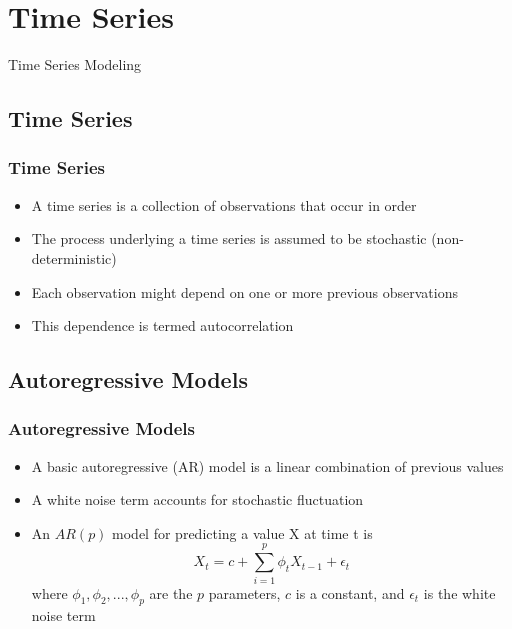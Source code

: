 \documentclass[presentation]{beamer}
\begin{document}
\section{Time Series}

\begin{frame}
\begin{center}
\Large{Time Series Modeling}
\end{center}
\end{frame}


\subsection{Time Series}

\begin{frame}[t]
\frametitle{Time Series }
\begin{itemize}
\item{A time series is a collection of observations that occur in order}
\item{The process underlying a time series is assumed to be stochastic (non-deterministic)}
\item{Each observation might depend on one or more previous observations}
\item{This dependence is termed autocorrelation}
\end{itemize}
\end{frame}

\subsection{Autoregressive Models}

\begin{frame}[t]
\frametitle{Autoregressive Models}
\begin{itemize}
\item{A basic autoregressive (AR) model is a linear combination of previous values}
\item{A white noise term accounts for stochastic fluctuation}
\item{An $AR(p)$ model for predicting a value X at time t is
\begin{equation}
X_t=c+\sum_{i=1}^{p}{\phi_t X_{t-1}+\epsilon_t}
\end{equation}
where $\phi_1, \phi_2, ..., \phi_p$ are the $p$ parameters, $c$ is a constant, and $\epsilon_t$ is the white noise term}
\end{itemize}
\end{frame}
\end{document}
